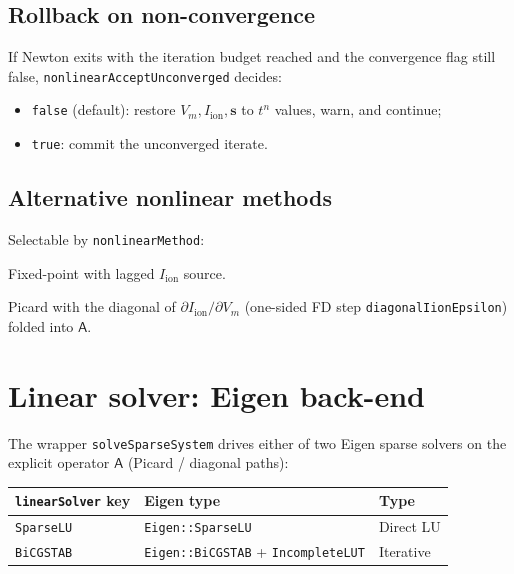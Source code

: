 \documentclass[11pt,a4paper]{article}
\newcommand{\Vm}{V_{m}}
\newcommand{\Iion}{I_{\text{ion}}}
\newcommand{\Aimp}{\mathsf{A}}
\newcommand{\code}[1]{\texttt{\small #1}}
\begin{document}
\subsection{Rollback on non-convergence}

If Newton exits with the iteration budget reached and the convergence
flag still false, \code{nonlinearAcceptUnconverged} decides:
\begin{itemize}[topsep=0pt]
  \item \code{false} (default): restore $\Vm, \Iion, \mathbf{s}$ to
        $t^{n}$ values, warn, and continue;
  \item \code{true}: commit the unconverged iterate.
\end{itemize}

\subsection{Alternative nonlinear methods}

Selectable by \code{nonlinearMethod}:
\begin{description}[style=nextline]
  \item[\code{picard}] Fixed-point with lagged $\Iion$ source.
  \item[\code{diagonalIion}] Picard with the diagonal of
        $\partial \Iion / \partial \Vm$ (one-sided FD step
        \code{diagonalIionEpsilon}) folded into $\Aimp$.
\end{description}

\section{Linear solver: Eigen back-end}

The wrapper \code{solveSparseSystem} drives either of two Eigen sparse
solvers on the explicit operator $\Aimp$ (Picard / diagonal paths):

\begin{center}
\begin{tabular}{@{}lll@{}}
\toprule
\code{linearSolver} key & Eigen type & Type \\
\midrule
\code{SparseLU}  & \code{Eigen::SparseLU} & Direct LU \\
\code{BiCGSTAB}  & \code{Eigen::BiCGSTAB} + \code{IncompleteLUT} & Iterative \\
\bottomrule
\end{tabular}
\end{center}
\end{document}

